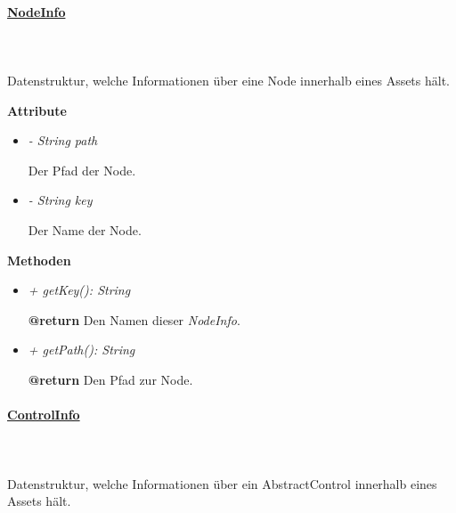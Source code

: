     \paragraph{\underline{NodeInfo}} \mbox{}\\
    \\
        Datenstruktur, welche Informationen über eine Node innerhalb eines Assets hält.\par

        \textbf{Attribute}
        \begin{itemize}
            \item \textit{- String path}
                \begin{leftbar}[0.9\linewidth]
                    Der Pfad der Node.
                \end{leftbar}
            \item \textit{- String key}
                \begin{leftbar}[0.9\linewidth]
                    Der Name der Node.
                \end{leftbar}
        \end{itemize}
        \textbf{Methoden}
        \begin{itemize}
            \item \textit{+ getKey(): String}
                \begin{leftbar}[0.9\linewidth]
                    \textbf{@return} Den Namen dieser \textit{NodeInfo}.
                \end{leftbar}
            \item \textit{+ getPath(): String}
                \begin{leftbar}[0.9\linewidth]
                    \textbf{@return} Den Pfad zur Node.
                \end{leftbar}
        \end{itemize}

    \pagebreak
    \paragraph{\underline{ControlInfo}} \mbox{}\\
    \\
        Datenstruktur, welche Informationen über ein AbstractControl innerhalb eines Assets hält.\par

